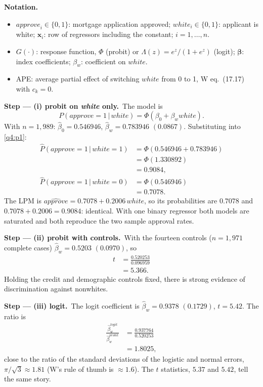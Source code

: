 \documentclass[11pt,a4paper]{article}
\numberwithin{equation}{questao}
\newenvironment{notacao}{\par\smallskip\noindent\textbf{Notation.}\begin{itemize}[leftmargin=1.4em,topsep=1pt,itemsep=0pt]\small}{\end{itemize}}
\newcommand{\passo}[2]{\par\smallskip\noindent\textbf{Step --- #1.}~#2}
\newcommand{\var}[1]{\mathit{#1}}
\begin{document}
\begin{sol}
\begin{notacao}
\item $\var{approve}_i\in\{0,1\}$: mortgage application approved; $\var{white}_i\in\{0,1\}$: applicant is white; $\mathbf{x}_i$: row of regressors including the constant; $i=1,\dots,n$.
\item $G(\cdot)$: response function, $\Phi$ (probit) or $\Lambda(z)=e^z/(1+e^z)$ (logit); $\boldsymbol\beta$: index coefficients; $\beta_w$: coefficient on $\var{white}$.
\item APE: average partial effect of switching $\var{white}$ from 0 to 1, W eq.~(17.17) with $c_k=0$.
\end{notacao}

\passo{(i) probit on \textit{white} only}{The model is
\begin{equation}
P(\var{approve}=1\,|\,\var{white})=\Phi(\beta_0+\beta_w\var{white}). \label{q4:p1}
\end{equation}
With $n=1{,}989$: $\hat\beta_0=0.546946$, $\hat\beta_w=0.783946$ $(0.0867)$. Substituting into \eqref{q4:p1}:
\begin{align*}
\hat P(\var{approve}=1\,|\,\var{white}=1)&=\Phi(0.546946+0.783946)\\
&=\Phi(1.330892)\\
&=0.9084,\\
\hat P(\var{approve}=1\,|\,\var{white}=0)&=\Phi(0.546946)\\
&=0.7078.
\end{align*}
The LPM is $\widehat{\var{approve}}=0.7078+0.2006\,\var{white}$, so its probabilities are $0.7078$ and
$0.7078+0.2006=0.9084$: identical. With one binary regressor both models are saturated and both
reproduce the two sample approval rates.}

\passo{(ii) probit with controls}{With the fourteen controls ($n=1{,}971$ complete cases)
$\hat\beta_w=0.5203$ $(0.0970)$, so
\begin{align*}
t &= \frac{0.520253}{0.096959}\\
&= 5.366 .
\end{align*}
Holding the credit and demographic controls fixed, there is strong evidence of discrimination against nonwhites.}

\passo{(iii) logit}{The logit coefficient is $\hat\beta_w=0.9378$ $(0.1729)$, $t=5.42$. The ratio is
\begin{align*}
\frac{\hat\beta_w^{logit}}{\hat\beta_w^{probit}}&=\frac{0.937764}{0.520253}\\
&=1.8025 ,
\end{align*}
close to the ratio of the standard deviations of the logistic and normal errors, $\pi/\sqrt3\approx1.81$
(W's rule of thumb is $\approx1.6$). The $t$ statistics, $5.37$ and $5.42$, tell the same story.}


\end{sol}
\end{document}
